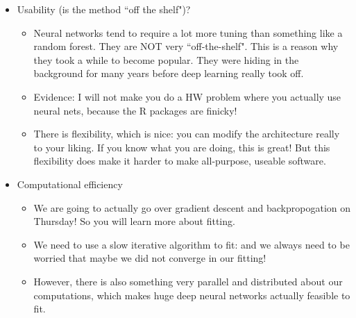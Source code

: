 \begin{itemize}
\begin{itemize}
\end{itemize}
\item Usability (is the method ``off the shelf")?
\begin{itemize}
\item Neural networks tend to require a lot more tuning than something like a random forest. They are NOT very ``off-the-shelf". This is a reason why they took a while to become popular. They were hiding in the background for many years before deep learning really took off. 
 \item Evidence: I will not make you do a HW problem where you actually use neural nets, because the R packages are finicky! 
\item There is flexibility, which is nice: you can modify the architecture really to your liking. If you know what you are doing, this is great! But this flexibility does make it harder to make all-purpose, useable software. 
\end{itemize}
\item Computational efficiency	
\begin{itemize}
\item We are going to actually go over gradient descent and backpropogation on Thursday! So you will learn more about fitting. 
\item We need to use a slow iterative algorithm to fit: and we always need to be worried that maybe we did not converge in our fitting! 
\item However, there is also something very parallel and distributed about our computations, which makes huge deep neural networks actually feasible to fit. 
\end{itemize}
\end{itemize}




